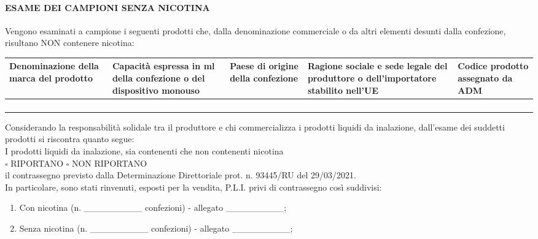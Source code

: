 \documentclass[12pt]{article}
\begin{document}
\paragraph{ESAME DEI CAMPIONI SENZA NICOTINA}Vengono esaminati a campione i seguenti prodotti che, dalla denominazione commerciale o da altri elementi desunti dalla confezione, risultano NON contenere nicotina:

\begin{tabularx}{\textwidth}{|Y|Y|Y|Y|Y|}
    \hline
    Denominazione della marca del prodotto & Capacità espressa in ml della confezione o del dispositivo monouso & Paese di origine della confezione & Ragione sociale e sede legale del produttore o dell'importatore stabilito nell'UE & Codice prodotto assegnato da ADM \\
    \hline
     & & & & \\[20pt]
    \hline
     & & & & \\[20pt]
    \hline
     & & & & \\[20pt]
    \hline
     & & & & \\[20pt]
    \hline
\end{tabularx}

\newpage

Considerando la responsabilità solidale tra il produttore e chi commercializza i prodotti liquidi da inalazione, dall’esame dei suddetti prodotti si riscontra quanto segue:\\
I prodotti liquidi da inalazione, sia contenenti che non contenenti nicotina \\
\begin{math}\square\end{math} RIPORTANO \begin{math}\square\end{math} NON RIPORTANO\\
il contrassegno previsto dalla Determinazione Direttoriale prot. n. 93445/RU del 29/03/2021.\\
In particolare, sono stati rinvenuti, esposti per la vendita, P.L.I. privi di contrassegno così suddivisi:
\begin{enumerate}[label=\begin{math}\square\end{math}]
    \item Con nicotina (n. \_\_\_\_\_\_\_\_\_ confezioni) - allegato \_\_\_\_\_\_\_\_\_;
    \item Senza nicotina (n. \_\_\_\_\_\_\_\_\_ confezioni) - allegato \_\_\_\_\_\_\_\_\_;
\end{enumerate}
\end{document}
